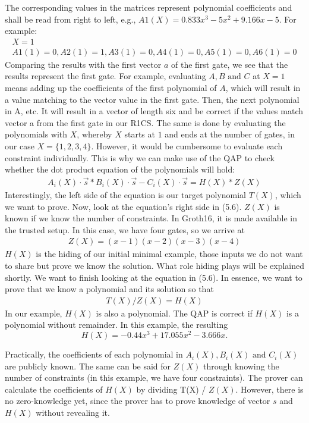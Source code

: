 The corresponding values in the matrices represent polynomial coefficients and shall be read from right to left, e.g., \(A1(X) = 0.833x^3 - 5x^2 + 9.166x -5\). For example:
\begin{align}
     X = 1 \\
    A1(1) = 0, A2(1) = 1, A3(1) = 0, A4(1) = 0, A5(1) = 0, A6(1) = 0
\end{align}
Comparing the results with the first vector \(a\) of the first gate, we see that the results represent the first gate.
For example, evaluating \(A, B \text{ and }C\) at \(X = 1\) means adding up the coefficients of the first polynomial of \(A\), which will result in a value matching to the vector value in the first gate. Then, the next polynomial in A, etc. It will result in a vector of length six and be correct if the values match vector a from the first gate in our R1CS. The same is done by evaluating the polynomials with \(X\), whereby \(X\) starts at \(1\) and ends at the number of gates, in our case \(X=\{1,2,3,4\}\).
However, it would be cumbersome to evaluate each constraint individually. This is why we can make use of the QAP to check whether the dot product equation of the polynomials will hold:
\begin{align}
    A_i(X)\cdot \Vec{s} * B_i(X)\cdot \Vec{s} - C_i(X)\cdot \Vec{s} = H(X) * Z(X)
\end{align}
Interestingly, the left side of the equation is our target polynomial \(T(X)\), which we want to prove.
Now, look at the equation's right side in (5.6). \(Z(X)\) is known if we know the number of constraints. In Groth16, it is made available in the trusted setup. In this case, we have four gates, so we arrive at
\begin{align}
    Z(X) = (x-1)(x-2)(x-3)(x-4)
\end{align}
\(H(X)\) is the hiding of our initial minimal example, those inputs we do not want to share but prove we know the solution. What role hiding plays will be explained shortly. We want to finish looking at the equation in (5.6). In essence, we want to prove that we know a polynomial and its solution so that
\begin{align}
    T(X) / Z(X) = H(X)
\end{align}
In our example, \(H(X)\) is also a polynomial. The QAP is correct if \(H(X)\) is a polynomial without remainder. In this example, the resulting
\[H(X) = -0.44x^3 + 17.055x^2 - 3.666x.\]

Practically, the coefficients of each polynomial in \(A_i(X), B_i(X) \text{ and }C_i(X)\) are publicly known. The same can be said for \(Z(X)\) through knowing the number of constraints (in this example, we have four constraints). The prover can calculate the coefficients of \(H(X)\) by dividing T(X) / \(Z(X)\). However, there is no zero-knowledge yet, since the prover has to prove knowledge of vector \(s\) and \(H(X)\) without revealing it.
\newpage

